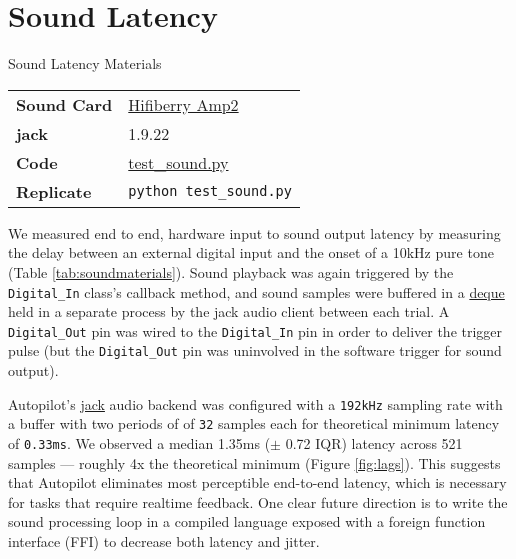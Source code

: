 \section{Sound Latency}
\label{sec:soundlatency}

\begin{margintable}[0.3cm]
\caption{Sound Latency Materials}
\label{tab:soundmaterials}
\noindent\begin{tabularx}{\linewidth}{lX}%
\toprule
\textbf{Sound Card} & \href{https://wiki.auto-pi-lot.com/index.php/HiFiBerry_Amp2}{Hifiberry Amp2} \\
\textbf{jack} & 1.9.22 \\
\textbf{Code} & \href{https://github.com/auto-pi-lot/plugin-paper/blob/main/plugin_paper/scripts/test_sound.py}{test\_sound.py} \\
\textbf{Replicate} & \texttt{python test\_sound.py} \\
\bottomrule
\end{tabularx}
\end{margintable}

We measured end to end, hardware input to sound output latency by measuring the delay between an external digital input and the onset of a 10kHz pure tone (Table \ref{tab:soundmaterials}). Sound playback was again triggered by the \texttt{Digital\_In} class's callback method, and sound samples were buffered in a \href{https://docs.python.org/3/library/collections.html#collections.deque}{deque} held in a separate process by the jack audio client between each trial. A \texttt{Digital\_Out} pin was wired to the \texttt{Digital\_In} pin in order to deliver the trigger pulse (but the \texttt{Digital\_Out} pin was uninvolved in the software trigger for sound output).

Autopilot's \href{http://jackaudio.org/}{jack} audio backend was configured with a \texttt{192kHz} sampling rate with a buffer with two periods of of \texttt{32} samples each for theoretical minimum latency of \texttt{0.33ms}. We observed a median 1.35ms ($\pm$ 0.72 IQR) latency across 521 samples --- roughly 4x the theoretical minimum (Figure \ref{fig:lags}). This suggests that Autopilot eliminates most perceptible end-to-end latency, which is necessary for tasks that require realtime feedback. One clear future direction is to write the sound processing loop in a compiled language exposed with a foreign function interface (FFI) to decrease both latency and jitter.

